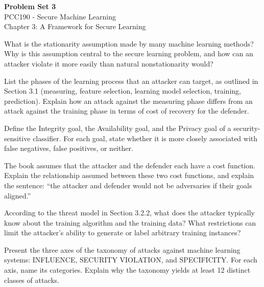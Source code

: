 \documentclass[10pt]{extarticle}
\begin{document}
\begin{center}
    {\LARGE\bfseries\color{darkblue}Problem Set 3}\\[0.3cm]
    {\large\color{accentorange} PCC190 - Secure Machine Learning}\\[0.3cm]
    {\normalsize\color{darkblue} Chapter 3: A Framework for Secure Learning}\\[0.5cm]
\end{center}


\begin{questoes}

\item What is the stationarity assumption made by many machine learning methods? Why is this assumption central to the secure learning problem, and how can an attacker violate it more easily than natural nonstationarity would?

\item List the phases of the learning process that an attacker can target, as outlined in Section 3.1 (measuring, feature selection, learning model selection, training, prediction). Explain how an attack against the measuring phase differs from an attack against the training phase in terms of cost of recovery for the defender.

\item Define the Integrity goal, the Availability goal, and the Privacy goal of a security-sensitive classifier. For each goal, state whether it is more closely associated with false negatives, false positives, or neither.

\item The book assumes that the attacker and the defender each have a cost function. Explain the relationship assumed between these two cost functions, and explain the sentence: ``the attacker and defender would not be adversaries if their goals aligned.''

\item According to the threat model in Section 3.2.2, what does the attacker typically know about the training algorithm and the training data? What restrictions can limit the attacker's ability to generate or label arbitrary training instances?

\item Present the three axes of the taxonomy of attacks against machine learning systems: INFLUENCE, SECURITY VIOLATION, and SPECIFICITY. For each axis, name its categories. Explain why the taxonomy yields at least 12 distinct classes of attacks.


\end{questoes}
\end{document}
